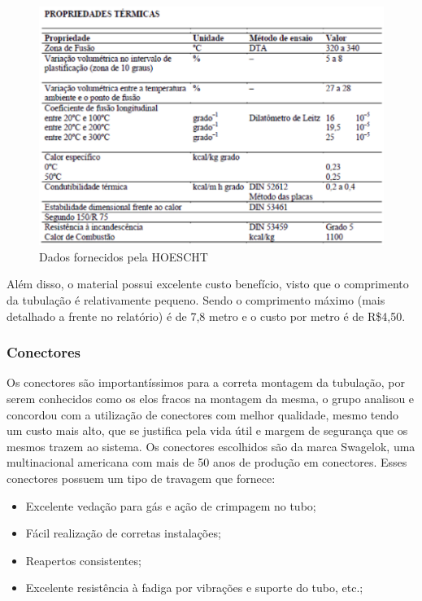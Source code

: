\begin{figure}[!htb]                                                               
   \centering                                                                      
   \includegraphics[scale=0.6, keepaspectratio=true]{figuras/tabela2.eps} 
   \caption{Dados fornecidos pela HOESCHT}              
\end{figure}

Além disso, o material possui excelente custo benefício, visto que o comprimento da tubulação é relativamente pequeno. Sendo o comprimento máximo (mais detalhado a frente no relatório) é de 7,8 metro e o custo por metro é de R\$4,50.

\subsubsection{Conectores}

Os conectores são importantíssimos para a correta montagem da tubulação, por serem conhecidos como os elos fracos na montagem da mesma, o grupo analisou e concordou com a utilização de conectores com melhor qualidade, mesmo tendo um custo mais alto, que se justifica pela vida útil e margem de segurança que os mesmos trazem ao sistema.
Os conectores escolhidos são da marca Swagelok, uma multinacional americana com mais de 50 anos de produção em conectores. Esses conectores possuem um tipo de travagem que fornece:
\begin{itemize}
\item Excelente vedação para gás e ação de crimpagem no tubo;
\item Fácil realização de corretas instalações;
\item Reapertos consistentes; 
\item Excelente resistência à fadiga por vibrações e suporte do tubo, etc.;
\end{itemize}

